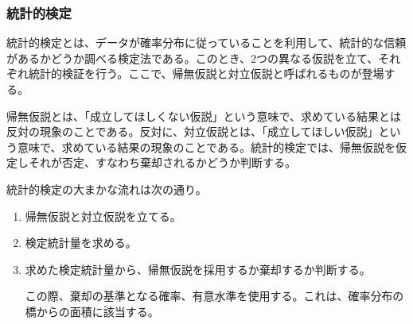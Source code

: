 \documentclass[dvipdfmx]{jsarticle}
\begin{document}
\subsubsection{統計的検定}
統計的検定とは、データが確率分布に従っていることを利用して、統計的な信頼があるかどうか調べる検定法である。このとき、2つの異なる仮説を立て、それぞれ統計的検証を行う。ここで、帰無仮説と対立仮説と呼ばれるものが登場する。\par
帰無仮説とは、「成立してほしくない仮説」という意味で、求めている結果とは反対の現象のことである。反対に、対立仮説とは、「成立してほしい仮説」という意味で、求めている結果の現象のことである。統計的検定では、帰無仮説を仮定しそれが否定、すなわち棄却されるかどうか判断する。\par
統計的検定の大まかな流れは次の通り。
\begin{enumerate}
  \item 帰無仮説と対立仮説を立てる。
  \item 検定統計量を求める。
  \item 求めた検定統計量から、帰無仮説を採用するか棄却するか判断する。\par
  この際、棄却の基準となる確率、有意水準を使用する。これは、確率分布の橋からの面積に該当する。
\end{enumerate}
\end{document}
